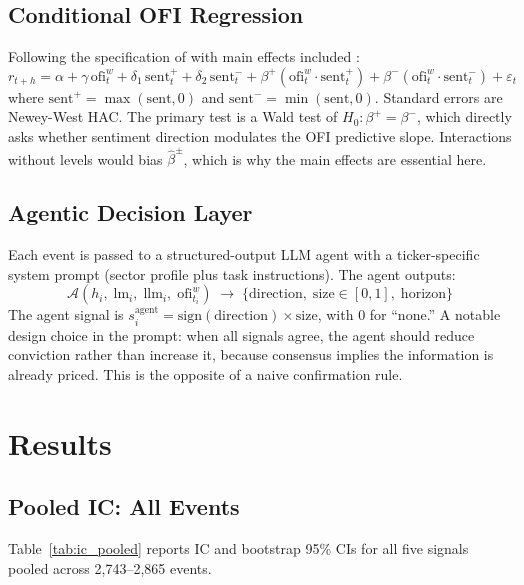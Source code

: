 \documentclass[11pt, letterpaper]{article}
\begin{document}
\subsection{Conditional OFI Regression}

Following the specification of \citet{lu2024trade} with main effects included
\citep{brambor2006understanding}:
\begin{equation}
\label{eq:regression}
    r_{t+h} = \alpha + \gamma\,\mathrm{ofi}^w_t
    + \delta_1\,\mathrm{sent}^+_t + \delta_2\,\mathrm{sent}^-_t
    + \beta^+(\mathrm{ofi}^w_t \cdot \mathrm{sent}^+_t)
    + \beta^-(\mathrm{ofi}^w_t \cdot \mathrm{sent}^-_t)
    + \varepsilon_t
\end{equation}
where $\mathrm{sent}^+ = \max(\mathrm{sent}, 0)$ and $\mathrm{sent}^- = \min(\mathrm{sent}, 0)$.
Standard errors are Newey-West HAC. The primary test is a Wald test of
$H_0: \beta^+ = \beta^-$, which directly asks whether sentiment direction modulates
the OFI predictive slope. Interactions without levels would bias $\hat{\beta}^\pm$,
which is why the main effects are essential here.

\subsection{Agentic Decision Layer}

Each event is passed to a structured-output LLM agent with a ticker-specific system
prompt (sector profile plus task instructions). The agent outputs:
\[
    \mathcal{A}(h_i,\; \mathrm{lm}_i,\; \mathrm{llm}_i,\; \mathrm{ofi}^w_{t_i})
    \;\to\; \{\mathrm{direction},\; \mathrm{size} \in [0,1],\; \mathrm{horizon}\}
\]
The agent signal is $s^{\mathrm{agent}}_i = \mathrm{sign}(\mathrm{direction}) \times
\mathrm{size}$, with 0 for ``none.'' A notable design choice in the prompt: when
all signals agree, the agent should reduce conviction rather than increase it, because
consensus implies the information is already priced. This is the opposite of a naive
confirmation rule.

\section{Results}
\label{sec:results}

\subsection{Pooled IC: All Events}

Table~\ref{tab:ic_pooled} reports IC and bootstrap 95\% CIs for all five signals
pooled across 2,743--2,865 events.
\end{document}

